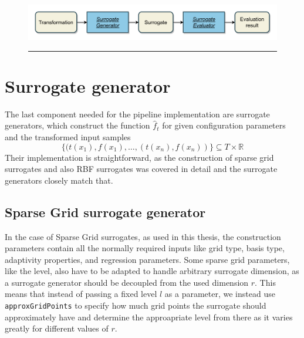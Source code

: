 \documentclass[
  a4paper,  %
  twoside,  %
  bibliography=totoc,
  headsepline,
  cleardoublepage=empty,
  parskip=half,
  draft=false
]{scrbook}
\newcommand{\delimit}{{\color{charcoal}\noindent\rule{\textwidth}{1pt}}}
\begin{document}
\newpage
\begin{mdframed}[style=style,frametitle={Transformation evaluator (forward looking)}]
\begin{figure}[H]
\includegraphics[width=\textwidth]{graphics/TransformationEval.pdf}
\delimit

\label{fig:te}
\end{figure}
\end{mdframed}

\section {Surrogate generator}
\label{sec:sg}

The last component needed for the pipeline implementation are surrogate generators, which construct the function $\hat{f}_t$ for given configuration parameters and the transformed input samples
\begin{equation}
\{(t(x_1), f(x_1), \dots, (t(x_n), f(x_n))\} \subseteq T \times \mathds{R}
\end{equation}
Their implementation is straightforward, as the construction of sparse grid surrogates and also RBF surrogates was covered in detail and the surrogate generators closely match that.


\subsection {Sparse Grid surrogate generator}

In the case of Sparse Grid surrogates, as used in this thesis, the construction parameters contain all the normally required inputs like grid type, basis type, adaptivity properties, and regression parameters.
Some sparse grid parameters, like the level, also have to be adapted to handle arbitrary surrogate dimension, as a surrogate generator should be decoupled from the used dimension $r$. 
This means that instead of passing a fixed level $l$ as a parameter, we instead use \texttt{approxGridPoints} to specify how much grid points the surrogate should approximately have and determine the approapriate level from there as it varies greatly for different values of $r$.
\end{document}
